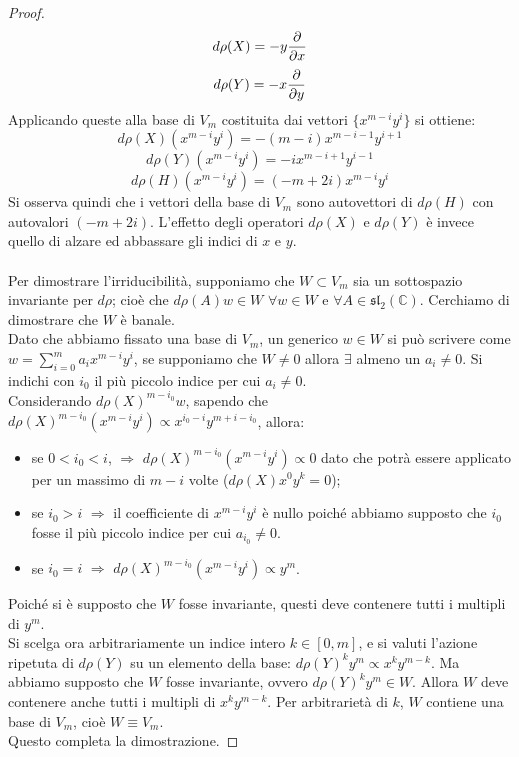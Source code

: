 \documentclass[12pt,a4paper]{report}
\theoremstyle{definition}
\theoremstyle{definition}
\theoremstyle{definition}
\theoremstyle{remark}
\begin{document}
\begin{proof}
	\begin{equation*}
	d\rho(X)=-y{\partial\over\partial x}
\end{equation*}
	\begin{equation*}
	d\rho(Y)=-x{\partial\over\partial y}
\end{equation*}
	Applicando queste alla base di $V_m$ costituita dai vettori $\{x^{m-i}y^i\}$ si ottiene:
	$$d\rho(X)(x^{m-i}y^i)=-(m-i)x^{m-i-1}y^{i+1}$$
	$$d\rho(Y)(x^{m-i}y^i)=-ix^{m-i+1}y^{i-1}$$
	$$d\rho(H)(x^{m-i}y^i)=(-m+2i)x^{m-i}y^i$$
	Si osserva quindi che i vettori della base di $V_m$ sono autovettori di $d\rho(H)$ con autovalori $(-m+2i)$. L'effetto degli operatori $d\rho(X)$ e $d\rho(Y)$ è invece quello di alzare ed abbassare gli indici di $x$ e $y$.\\
	\\
	Per dimostrare l'irriducibilità, supponiamo che $W\subset V_m$ sia un sottospazio invariante per $d\rho$; cioè che $d\rho(A)w\in W$ $\forall w\in W$ e $\forall A\in \mathfrak{sl_2(\mathbb{C})}$. Cerchiamo di dimostrare che $W$ è banale. \\Dato che abbiamo fissato una base di $V_m$, un generico $w\in W$ si può scrivere come $w=\sum_{i=0}^{m}a_ix^{m-i}y^i$, se supponiamo che $W\neq{0}$ allora $\exists$ almeno un $a_i\neq 0$.
	Si indichi con $i_0$ il più piccolo indice per cui $a_i\neq 0$. \\
	Considerando $d\rho(X)^{m-i_0}w$, sapendo che $d\rho(X)^{m-i_0}(x^{m-i}y^i)\propto x^{i_0-i}y^{m+i-i_0}$, allora:
	\begin{itemize}
		\item se $0<i_0<i$, $\Rightarrow$ $d\rho(X)^{m-i_0}(x^{m-i}y^i)\propto 0$ dato che potrà essere applicato per un massimo di $m-i$ volte ($d\rho(X)x^0y^k=0$);
		\item se $i_0>i$ $\Rightarrow$ il coefficiente di $x^{m-i}y^{i}$ è nullo poiché abbiamo supposto che $i_0$ fosse il più piccolo indice per cui $a_{i_0}\neq 0$. 
		\item se $i_0=i$ $\Rightarrow$ $d\rho(X)^{m-i_0}(x^{m-i}y^i)\propto y^m$.
	\end{itemize} 
	Poiché si è supposto che $W$ fosse invariante, questi deve contenere tutti i multipli di $y^m$.\\
	Si scelga ora arbitrariamente un indice intero $k\in[0,m]$, e si valuti l'azione ripetuta di $d\rho(Y)$ su un elemento della base: $d\rho(Y)^ky^m\propto x^ky^{m-k}$.
	Ma abbiamo supposto che $W$ fosse invariante, ovvero $d\rho(Y)^ky^m\in W$. Allora $W$ deve contenere anche tutti i multipli di $x^ky^{m-k}$. Per arbitrarietà di $k$, $W$ contiene una base di $V_m$, cioè $W\equiv V_m$.\\
	Questo completa la dimostrazione.
\end{proof}
\end{document}
